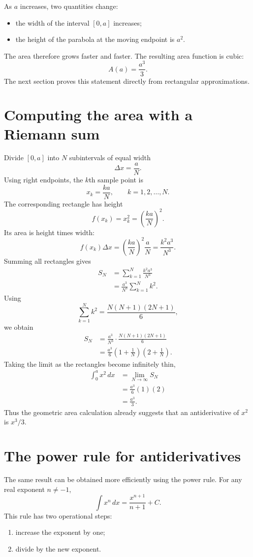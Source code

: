 \documentclass[11pt]{article}
\begin{document}
As $a$ increases, two quantities change:
\begin{itemize}[leftmargin=2em]
  \item the width of the interval $[0,a]$ increases;
  \item the height of the parabola at the moving endpoint is $a^2$.
\end{itemize}
The area therefore grows faster and faster. The resulting area function is cubic:
\[
A(a)=\frac{a^3}{3}.
\]
The next section proves this statement directly from rectangular approximations.

\section{Computing the area with a Riemann sum}

Divide $[0,a]$ into $N$ subintervals of equal width
\[
\Delta x=\frac{a}{N}.
\]
Using right endpoints, the $k$th sample point is
\[
x_k=\frac{ka}{N}, \qquad k=1,2,\ldots,N.
\]
The corresponding rectangle has height
\[
f(x_k)=x_k^2=\left(\frac{ka}{N}\right)^2.
\]
Its area is height times width:
\[
f(x_k)\Delta x
=\left(\frac{ka}{N}\right)^2\frac{a}{N}
=\frac{k^2a^3}{N^3}.
\]
Summing all rectangles gives
\begin{align*}
S_N
&=\sum_{k=1}^{N}\frac{k^2a^3}{N^3}\\
&=\frac{a^3}{N^3}\sum_{k=1}^{N}k^2.
\end{align*}
Using
\[
\sum_{k=1}^{N}k^2=\frac{N(N+1)(2N+1)}{6},
\]
we obtain
\begin{align*}
S_N
&=\frac{a^3}{N^3}\cdot\frac{N(N+1)(2N+1)}{6}\\
&=\frac{a^3}{6}\left(1+\frac{1}{N}\right)
  \left(2+\frac{1}{N}\right).
\end{align*}
Taking the limit as the rectangles become infinitely thin,
\begin{align*}
\int_0^a x^2\,dx
&=\lim_{N\to\infty}S_N\\
&=\frac{a^3}{6}(1)(2)\\
&=\boxed{\frac{a^3}{3}}.
\end{align*}
Thus the geometric area calculation already suggests that an antiderivative of $x^2$ is $x^3/3$.

\section{The power rule for antiderivatives}

The same result can be obtained more efficiently using the power rule. For any real exponent $n\ne -1$,
\[
\boxed{\displaystyle \int x^n\,dx=\frac{x^{n+1}}{n+1}+C.}
\]
This rule has two operational steps:
\begin{enumerate}[leftmargin=2em]
  \item increase the exponent by one;
  \item divide by the new exponent.
\end{enumerate}
\end{document}
